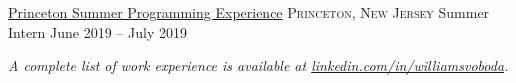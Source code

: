 \documentclass[10pt,letterpaper]{article}
\begin{document}
\headedsection
  {\href{https://www.cs.princeton.edu/academics/ugradpgm/spe/home/}{Princeton Summer Programming Experience}}
  {\textsc{Princeton, New Jersey}} {%
  \headedsubsection
    {Summer Intern}
    {June 2019 -- July 2019}
    {}
}

\vspace{-0.2em}
\begin{center}
  \emph{\small A complete list of work experience is available at \href{https://www.linkedin.com/in/williamsvoboda}{linkedin.com/in/williamsvoboda}.}
\end{center}

\spacedhrule{-0.2em}{-0.4em}




\end{document}
